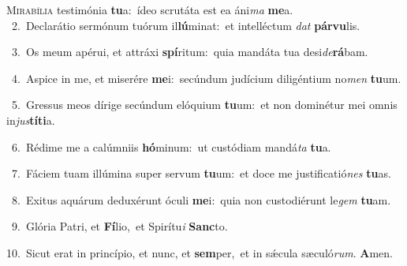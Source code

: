 \lettrine{\initial\textcolor{\initialcolor}{M}}{irabília} testimónia \textbf{tu}\-a:~\star ídeo scrutáta est ea áni\textit{ma} \textbf{me}\-a.\\
{\numbfont\textcolor{\numbcolor}{~2.}}~Declarátio sermónum tuórum il\-\textbf{lú}\-minat:~\star et intelléctum \textit{dat} \textbf{pár}\-\textbf{vu}lis.\par
{\numbfont\textcolor{\numbcolor}{~3.}}~Os meum apérui, et attráxi \textbf{spí}\-ritum:~\star quia mandáta tua desi\-\textit{de}\-\textbf{rá}bam.\par
{\numbfont\textcolor{\numbcolor}{~4.}}~Aspice in me, et miserére \textbf{me}\-i:~\star secúndum judícium diligéntium no\textit{men} \textbf{tu}\-um.\par
{\numbfont\textcolor{\numbcolor}{~5.}}~Gressus meos dírige secúndum elóquium \textbf{tu}\-um:~\star et non dominétur mei omnis in\-\textit{jus}\-\textbf{tí}\textbf{ti}a.\par
{\numbfont\textcolor{\numbcolor}{~6.}}~Rédime me a calúmniis \textbf{hó}\-minum:~\star ut custódiam mandá\textit{ta} \textbf{tu}\-a.\par
{\numbfont\textcolor{\numbcolor}{~7.}}~Fáciem tuam illúmina super servum \textbf{tu}\-um:~\star et doce me justificatió\textit{nes} \textbf{tu}\-as.\par
{\numbfont\textcolor{\numbcolor}{~8.}}~Exitus aquárum deduxérunt óculi \textbf{me}\-i:~\star quia non custodiérunt le\textit{gem} \textbf{tu}\-am.\par
{\numbfont\textcolor{\numbcolor}{~9.}}~Glória Patri, et \textbf{Fí}\-lio,~\star et Spirítu\textit{i} \textbf{Sanc}\-to.\par
{\numbfont\textcolor{\numbcolor}{10.}}~Sicut erat in princípio, et nunc, et \textbf{sem}\-per,~\star et in sǽcula sæculó\-\textit{rum}\-. \textbf{A}\-men.\par
